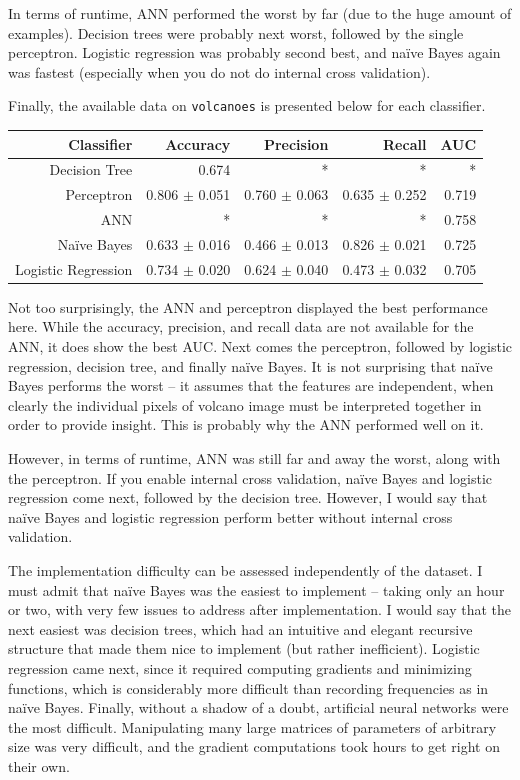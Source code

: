 \documentclass[fleqn]{homework}
\begin{document}
  In terms of runtime, ANN performed the worst by far (due to the huge amount of
  examples).  Decision trees were probably next worst, followed by the single
  perceptron.  Logistic regression was probably second best, and na\"ive Bayes
  again was fastest (especially when you do not do internal cross validation).

  Finally, the available data on \texttt{volcanoes} is presented below for each
  classifier.

  \vspace{0.3cm}
  \begin{tabular}{rrrrr}
    \hline
    Classifier & Accuracy & Precision & Recall & AUC \\
    \hline
    Decision Tree & 0.674 & * & * & * \\
    Perceptron & 0.806 $\pm$ 0.051 & 0.760 $\pm$ 0.063 & 0.635 $\pm$ 0.252 & 0.719 \\
    ANN & * & * & * & 0.758 \\
    Na\"ive Bayes & 0.633 $\pm$ 0.016 & 0.466 $\pm$ 0.013 & 0.826 $\pm$ 0.021 & 0.725 \\
    Logistic Regression & 0.734 $\pm$ 0.020 & 0.624 $\pm$ 0.040 & 0.473 $\pm$ 0.032 & 0.705 \\
    \hline
  \end{tabular}
  \vspace{0.3cm}

  Not too surprisingly, the ANN and perceptron displayed the best performance
  here.  While the accuracy, precision, and recall data are not available for
  the ANN, it does show the best AUC.  Next comes the perceptron, followed by
  logistic regression, decision tree, and finally na\"ive Bayes.  It is not
  surprising that na\"ive Bayes performs the worst -- it assumes that the
  features are independent, when clearly the individual pixels of volcano image
  must be interpreted together in order to provide insight.  This is probably
  why the ANN performed well on it.

  However, in terms of runtime, ANN was still far and away the worst, along with
  the perceptron.  If you enable internal cross validation, na\"ive Bayes and
  logistic regression come next, followed by the decision tree.  However, I
  would say that na\"ive Bayes and logistic regression perform better without
  internal cross validation.

  The implementation difficulty can be assessed independently of the dataset.  I
  must admit that na\"ive Bayes was the easiest to implement -- taking only an
  hour or two, with very few issues to address after implementation.  I would
  say that the next easiest was decision trees, which had an intuitive and
  elegant recursive structure that made them nice to implement (but rather
  inefficient).  Logistic regression came next, since it required computing
  gradients and minimizing functions, which is considerably more difficult than
  recording frequencies as in na\"ive Bayes.  Finally, without a shadow of a
  doubt, artificial neural networks were the most difficult.  Manipulating many
  large matrices of parameters of arbitrary size was very difficult, and the
  gradient computations took hours to get right on their own.
\end{document}
